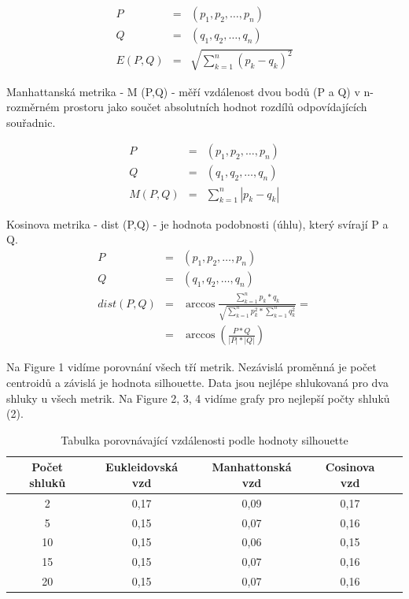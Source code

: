 \documentclass[journal]{IEEEtran}
\begin{document}
\begin{eqnarray*}
P&=&(p_1,p_2,\ldots,p_n)\\
Q&=&(q_1,q_2,\ldots,q_n)\\
E(P,Q)&= &\sqrt{\sum_{k=1}^{n}{(p_k-q_k)^2}}
\end{eqnarray*}

Manhattansk\'{a} metrika - M (P,Q) - m\v{e}\v{r}\'{i} vzd\'{a}lenost dvou bod\r{u} (P a Q) v n-rozm\v{e}rn\'{e}m prostoru jako sou\v{c}et absolutn\'{i}ch hodnot rozd\'{i}l\r{u} odpov\'{i}daj\'{i}c\'{i}ch sou\v{r}adnic.

\begin{eqnarray*}
P&=&(p_1,p_2,\ldots,p_n)\\
Q&=&(q_1,q_2,\ldots,q_n)\\
M(P,Q)&= &\sum_{k=1}^{n}{\left| p_k-q_k \right|}
\end{eqnarray*}

Kosinova metrika - dist (P,Q) - je hodnota podobnosti (\'{u}hlu), kter\'{y} sv\'{i}raj\'{i} P a Q.
\begin{eqnarray*}
P&=&(p_1,p_2,\ldots,p_n)\\
Q&=&(q_1,q_2,\ldots,q_n)\\
dist(P,Q)&= &\arccos{\frac{\sum_{k=1}^{n}{ p_k*q_k }}{\sqrt{\sum_{k=1}^{n}{p_k^2}*\sum_{k=1}^{n}{q_k^2}}}}=\\
&=&\arccos{(\frac{P*Q}{\left|P\right|*\left|Q\right|})}
\end{eqnarray*}

Na Figure 1 vid\'{i}me porovn\'{a}n\'{i} v\v{s}ech t\v{r}\'{i} metrik. Nez\'{a}visl\'{a} prom\v{e}nn\'{a} je po\v{c}et centroid\r{u} a z\'{a}visl\'{a} je hodnota silhouette. Data jsou nejl\'{e}pe shlukovan\'{a} pro dva shluky u v\v{s}ech metrik. Na Figure 2, 3, 4 vid\'{i}me grafy pro nejlep\v{s}\'{i} po\v{c}ty shluk\r{u} (2).


\begin{table}
\renewcommand{\arraystretch}{1.3}
\caption{Tabulka porovn\'{a}vaj\'{i}c\'{i} vzd\'{a}lenosti podle hodnoty silhouette}
\label{table_example}
\centering
\begin{tabular}{|c|c|c|c|c|}

\hline
Po\v{c}et shluk\r{u} & Eukleidovsk\'{a} vzd & Manhattonsk\'{a} vzd & Cosinova vzd \\
\hline
\hline
2 &	0,17 &	0,09 &	0,17\\
\hline
5 &	0,15 &	0,07 &	0,16\\
\hline
10 &	0,15&	0,06&	0,15\\
\hline
15	&0,15&	0,07&	0,16\\
\hline
20&	0,15&	0,07&	0,16\\
\hline
\end{tabular}
\end{table}
\end{document}
